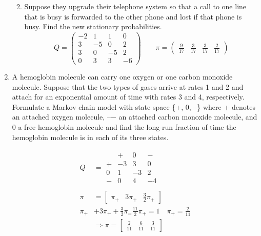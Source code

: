 \documentclass[12pt]{article}
\begin{document}
\begin{enumerate}
\begin{enumerate}[label=(\alph*)]
    \vspace{2\baselineskip}
    \item Suppose they upgrade their telephone system so that a call to one line that is busy is forwarded to the other phone and lost if that phone is busy. Find the new stationary probabilities.
    $$Q=\begin{pmatrix}
    -2&1&1&0 \\ 
    3&-5&0&2\\
    3&0&-5&2\\ 
    0&3&3&-6
    \end{pmatrix}\qquad
    \pi = \begin{pmatrix}
    \frac{9}{17}&\frac{3}{17}&\frac{3}{17}&\frac{2}{17}
    \end{pmatrix}$$
    \hfill{}
\end{enumerate}



\newpage
\item A hemoglobin molecule can carry one oxygen or one carbon monoxide molecule. Suppose that the two types of gases arrive at rates 1 and 2 and attach for an exponential amount of time with rates 3 and 4, respectively. Formulate a Markov chain model with state space \{+, 0, \---\} where + denotes an attached oxygen molecule, \---− an attached carbon monoxide molecule, and 0 a free hemoglobin molecule and find the long-run fraction of time the hemoglobin molecule is in each of its three states.

\begin{align}
Q&= \begin{matrix}
&+&0&-\\
+&-3&3&0\\
0&1&-3&2\\
-&0&4&-4
\end{matrix} \nonumber \\
\nonumber \\
\pi &= \begin{bmatrix}
\pi_+&3\pi_+&\frac{3}{2}\pi_+
\end{bmatrix} \tag{such that $\pi Q = 0$} \\
\pi_+ &+ 3\pi_+ + \frac{3}{2}\pi_ = \frac{11}{2} \pi_+ = 1\quad \pi_+ = \frac{2}{11} \nonumber \\
&\Rightarrow \pi = \begin{bmatrix}
\frac{2}{11}&\frac{6}{11}&\frac{3}{11} \nonumber
\end{bmatrix}
\end{align}


\end{enumerate}
\end{document}
